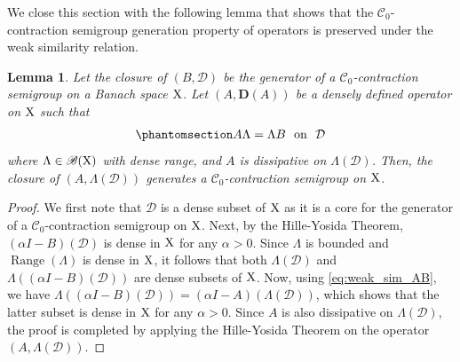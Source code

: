 \documentclass[12pt]{amsart}
\newcommand{\hlabel}{\phantomsection\label}
\numberwithin{equation}{section}
\newcommand{\cc}{\mathcal}
\newcommand{\Range}{\operatorname{Range}}
\newcommand{\D}{\mathbf{D}}
\newtheorem{lem}[thm]{Lemma}
\theoremstyle{definition}
\theoremstyle{assump}
\theoremstyle{remark}
\begin{document}
We close this section with the following lemma that shows that the $\cc{C}_0$-contraction semigroup generation property of operators is preserved under the weak similarity relation.
\begin{lem}\hlabel{lem:generator_intertwining}
	Let the closure of $(B,\cc D)$ be the generator of a $\cc{C}_0$-contraction semigroup on a Banach space ${\rm X}$. Let  $(A,\D(A))$ be a  densely defined operator on ${\rm X}$ such that
	\begin{align}\hlabel{eq:weak_sim_AB}
		A\Lambda =\Lambda B  \ \mbox{ on } \ \cc D
	\end{align}
	where $\Lambda \in \mathscr{B}({\rm X})$ with dense range, and $A$ is dissipative on $\Lambda(\cc D)$. Then, the closure of $(A,\Lambda(\cc D))$ generates a $\cc{C}_0$-contraction semigroup on ${\rm X}$.
	
	
	
\end{lem}
\begin{proof}
	We first note that $\cc D$ is a dense subset of ${\rm X}$ as it is a core for the generator of a $\cc C_0$-contraction semigroup on ${\rm X}$. Next, by the Hille-Yosida Theorem, $(\alpha I-B)(\cc D)$ is dense in ${\rm X}$ for any $\alpha>0$. Since $\Lambda$ is bounded and $\Range(\Lambda)$ is dense in ${\rm X}$, it follows that both $\Lambda(\cc D)$ and $\Lambda((\alpha I-B)(\cc D))$ are dense subsets of ${\rm X}$. Now, using \eqref{eq:weak_sim_AB}, we have $\Lambda((\alpha I-B)(\cc D))=(\alpha I-A)(\Lambda(\cc D))$, which shows that the latter subset is dense in ${\rm X}$ for any $\alpha>0$. Since $A$ is also dissipative on $\Lambda(\cc D)$, the proof is completed by applying the Hille-Yosida Theorem on the operator $(A,\Lambda(\cc D))$.
\end{proof}
\end{document}
